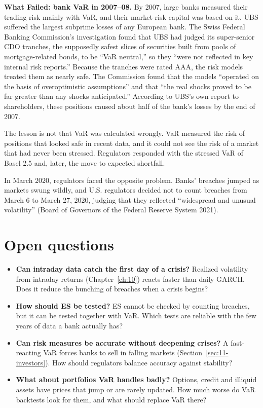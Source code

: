 \textbf{What Failed: bank VaR in 2007--08.} By 2007, large banks measured their trading risk mainly with VaR, and their market-risk capital was based on it. UBS suffered the largest subprime losses of any European bank. The Swiss Federal Banking Commission's investigation found that UBS had judged its super-senior CDO tranches, the supposedly safest slices of securities built from pools of mortgage-related bonds, to be ``VaR neutral,'' so they ``were not reflected in key internal risk reports.'' Because the tranches were rated AAA, the risk models treated them as nearly safe. The Commission found that the models ``operated on the basis of overoptimistic assumptions'' and that ``the real shocks proved to be far greater than any shocks anticipated.'' According to UBS's own report to shareholders, these positions caused about half of the bank's losses by the end of 2007.

The lesson is not that VaR was calculated wrongly. VaR measured the risk of positions that looked safe in recent data, and it could not see the risk of a market that had never been stressed. Regulators responded with the stressed VaR of Basel 2.5 and, later, the move to expected shortfall.

In March 2020, regulators faced the opposite problem. Banks' breaches jumped as markets swung wildly, and U.S. regulators decided not to count breaches from March 6 to March 27, 2020, judging that they reflected ``widespread and unusual volatility'' (Board of Governors of the Federal Reserve System 2021).


\section{Open questions}
\label{sec:11-open}

\begin{itemize}
  \item \textbf{Can intraday data catch the first day of a crisis?} Realized volatility from intraday returns (Chapter~\ref{ch:10}) reacts faster than daily GARCH. Does it reduce the bunching of breaches when a crisis begins?
  \item \textbf{How should ES be tested?} ES cannot be checked by counting breaches, but it can be tested together with VaR. Which tests are reliable with the few years of data a bank actually has?
  \item \textbf{Can risk measures be accurate without deepening crises?} A fast-reacting VaR forces banks to sell in falling markets (Section~\ref{sec:11-investors}). How should regulators balance accuracy against stability?
  \item \textbf{What about portfolios VaR handles badly?} Options, credit and illiquid assets have prices that jump or are rarely updated. How much worse do VaR backtests look for them, and what should replace VaR there?
\end{itemize}

